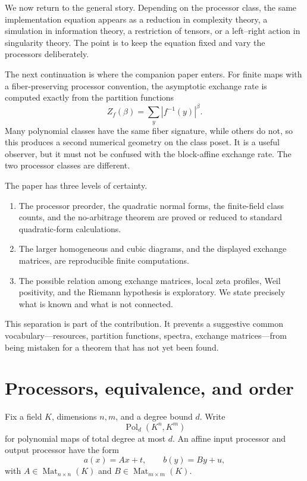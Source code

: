 \documentclass[11pt]{article}
\theoremstyle{definition}
\theoremstyle{plain}
\theoremstyle{remark}
\newcommand{\Pol}{\operatorname{Pol}}
\begin{document}
We now return to the general story.  Depending on the processor class, the
same implementation equation appears as a reduction in complexity theory, a
simulation in information theory, a restriction of tensors, or a left--right
action in singularity theory.  The point is to keep the equation fixed and
vary the processors deliberately.

The next continuation is where the companion paper
\cite{vorozhtsov-exchange} enters.  For finite maps with a fiber-preserving
processor convention, the asymptotic exchange rate is computed exactly from
the partition functions
\[
  Z_f(\beta)=\sum_y |f^{-1}(y)|^\beta.
\]
Many polynomial classes have the same fiber signature, while others do not,
so this produces a second numerical geometry on the class poset.  It is a
useful observer, but it must not be confused with the block-affine exchange
rate.  The two processor classes are different.

The paper has three levels of certainty.

\begin{enumerate}
  \item The processor preorder, the quadratic normal forms, the finite-field
  class counts, and the no-arbitrage theorem are proved or reduced to standard
  quadratic-form calculations.
  \item The larger homogeneous and cubic diagrams, and the displayed exchange
  matrices, are reproducible finite computations.
  \item The possible relation among exchange matrices, local zeta profiles,
  Weil positivity, and the Riemann hypothesis is exploratory.  We state
  precisely what is known and what is not connected.
\end{enumerate}

This separation is part of the contribution.  It prevents a suggestive common
vocabulary---resources, partition functions, spectra, exchange matrices---from
being mistaken for a theorem that has not yet been found.

\section{Processors, equivalence, and order}
\label{sec:processors}

Fix a field \(K\), dimensions \(n,m\), and a degree bound \(d\).  Write
\[
  \Pol_d(K^n,K^m)
\]
for polynomial maps of total degree at most \(d\).  An affine input processor
and output processor have the form
\[
  a(x)=Ax+t,
  \qquad
  b(y)=By+u,
\]
with \(A\in\operatorname{Mat}_{n\times n}(K)\) and
\(B\in\operatorname{Mat}_{m\times m}(K)\).
\end{document}

